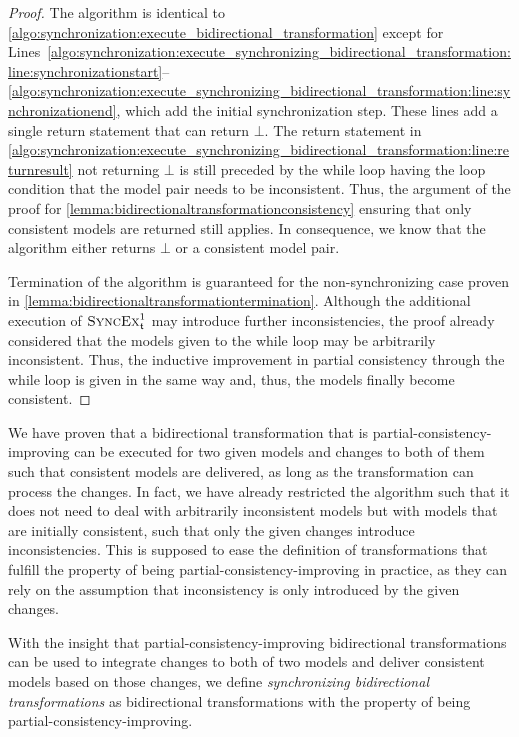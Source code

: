 \begin{proof}
    The algorithm is identical to \autoref{algo:synchronization:execute_bidirectional_transformation} except for Lines~\ref{algo:synchronization:execute_synchronizing_bidirectional_transformation:line:synchronizationstart}--\ref{algo:synchronization:execute_synchronizing_bidirectional_transformation:line:synchronizationend}, which add the initial synchronization step.
    These lines add a single return statement that can return $\bot$.
    The return statement in \autoref{algo:synchronization:execute_synchronizing_bidirectional_transformation:line:returnresult} not returning $\bot$ is still preceded by the while loop having the loop condition that the model pair needs to be inconsistent.
    Thus, the argument of the proof for \autoref{lemma:bidirectionaltransformationconsistency} ensuring that only consistent models are returned still applies.
    In consequence, we know that the algorithm either returns $\bot$ or a consistent model pair.

    Termination of the algorithm is guaranteed for the non-synchronizing case proven in \autoref{lemma:bidirectionaltransformationtermination}.
    Although the additional execution of $\function{SyncEx}_{\transformation{t}}^1$ may introduce further inconsistencies, the proof already considered that the models given to the while loop may be arbitrarily inconsistent.
    Thus, the inductive improvement in partial consistency through the while loop is given in the same way and, thus, the models finally become consistent.
\end{proof}

We have proven that a bidirectional transformation that is partial-consistency-improving can be executed for two given models and changes to both of them such that consistent models are delivered, as long as the transformation can process the changes.
In fact, we have already restricted the algorithm such that it does not need to deal with arbitrarily inconsistent models but with models that are initially consistent, such that only the given changes introduce inconsistencies.
This is supposed to ease the definition of transformations that fulfill the property of being partial-consistency-improving in practice, as they can rely on the assumption that inconsistency is only introduced by the given changes.

With the insight that partial-consistency-improving bidirectional transformations can be used to integrate changes to both of two models and deliver consistent models based on those changes, we define \emph{synchronizing bidirectional transformations} as bidirectional transformations with the property of being partial-consistency-improving.

